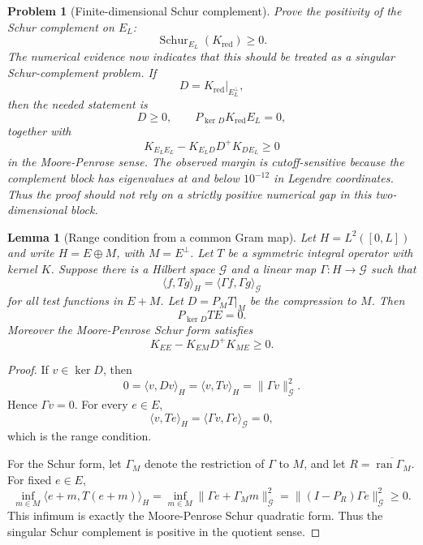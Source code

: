 \documentclass[11pt]{article}
\newtheorem{lemma}[theorem]{Lemma}
\newtheorem{problem}[theorem]{Problem}
\newcommand{\Kred}{K_{\mathrm{red}}}
\newcommand{\EL}{E_L}
\begin{document}
\begin{problem}[Finite-dimensional Schur complement]
Prove the positivity of the Schur complement on $\EL$:
\[
   \operatorname{Schur}_{\EL}(\Kred)\ge 0.
\]
The numerical evidence now indicates that this should be treated as a singular
Schur-complement problem.  If
\[
   D=\Kred|_{\EL^\perp},
\]
then the needed statement is
\[
   D\ge 0,\qquad
   P_{\ker D}\Kred \EL=0,
\]
together with
\[
   K_{\EL\EL}-K_{\EL D}D^+K_{D\EL}\ge 0
\]
in the Moore-Penrose sense.  The observed margin is cutoff-sensitive because
the complement block has eigenvalues at and below $10^{-12}$ in Legendre
coordinates.  Thus the proof should not rely on a strictly positive numerical
gap in this two-dimensional block.
\end{problem}

\begin{lemma}[Range condition from a common Gram map]
Let $H=L^2([0,L])$ and write $H=E\oplus M$, with $M=E^\perp$.  Let $T$ be a
symmetric integral operator with kernel $K$.  Suppose there is a Hilbert space
$\mathcal G$ and a linear map $\Gamma:H\to\mathcal G$ such that
\[
   \langle f,Tg\rangle_H
   =
   \langle \Gamma f,\Gamma g\rangle_{\mathcal G}
\]
for all test functions in $E+M$.  Let $D=P_MT|_M$ be the compression to $M$.
Then
\[
   P_{\ker D}TE=0.
\]
Moreover the Moore-Penrose Schur form satisfies
\[
   K_{EE}-K_{EM}D^+K_{ME}\ge 0.
\]
\end{lemma}

\begin{proof}
If $v\in\ker D$, then
\[
   0=\langle v,Dv\rangle_H=\langle v,Tv\rangle_H
    =\|\Gamma v\|_{\mathcal G}^2.
\]
Hence $\Gamma v=0$.  For every $e\in E$,
\[
   \langle v,Te\rangle_H
   =
   \langle \Gamma v,\Gamma e\rangle_{\mathcal G}
   =
   0,
\]
which is the range condition.

For the Schur form, let $\Gamma_M$ denote the restriction of $\Gamma$ to $M$,
and let $R=\overline{\operatorname{ran}\Gamma_M}$.  For fixed $e\in E$,
\[
   \inf_{m\in M}\langle e+m,T(e+m)\rangle_H
   =
   \inf_{m\in M}\|\Gamma e+\Gamma_Mm\|_{\mathcal G}^2
   =
   \|(I-P_R)\Gamma e\|_{\mathcal G}^2\ge 0.
\]
This infimum is exactly the Moore-Penrose Schur quadratic form.  Thus the
singular Schur complement is positive in the quotient sense.
\end{proof}
\end{document}
